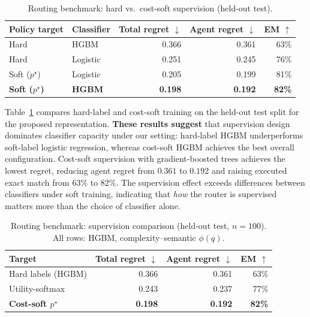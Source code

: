 \begin{table}[t]
  \centering
  \footnotesize
  \setlength{\tabcolsep}{3pt}
  \caption{Routing benchmark: hard vs.\ cost-soft supervision (held-out test).}
  \label{tab:hard-vs-soft}
  \begin{tabular}{@{}llrrr@{}}
    \toprule
    Policy target & Classifier & Total regret $\downarrow$ & Agent regret $\downarrow$ & EM $\uparrow$ \\
    \midrule
    Hard & HGBM & 0.366 & 0.361 & 63\% \\
    Hard & Logistic & 0.251 & 0.245 & 76\% \\
    Soft ($p^\star$) & Logistic & 0.205 & 0.199 & 81\% \\
    \textbf{Soft ($p^\star$)} & \textbf{HGBM} & \textbf{0.198} & \textbf{0.192} & \textbf{82\%} \\
    \bottomrule
  \end{tabular}
\end{table}

Table~\ref{tab:hard-vs-soft} compares hard-label and cost-soft training on the held-out test
split for the proposed representation.
\textbf{These results suggest} that supervision design dominates classifier capacity under our
setting: hard-label HGBM underperforms soft-label logistic regression, whereas cost-soft HGBM
achieves the best overall configuration.
Cost-soft supervision with gradient-boosted trees achieves the lowest regret, reducing agent
regret from $0.361$ to $0.192$ and raising executed exact match from 63\% to 82\%.
The supervision effect exceeds differences between classifiers under soft training,
indicating that \emph{how} the router is supervised matters more than the choice of
classifier alone.

\begin{table}[t]
  \centering
  \footnotesize
  \setlength{\tabcolsep}{3pt}
  \caption{Routing benchmark: supervision comparison (held-out test, $n{=}100$).
    All rows: HGBM, complexity--semantic $\phi(q)$.}
  \label{tab:soft-target}
  \begin{tabular}{@{}lrrr@{}}
    \toprule
    Target & Total regret $\downarrow$ & Agent regret $\downarrow$ & EM $\uparrow$ \\
    \midrule
    Hard labels (HGBM) & 0.366 & 0.361 & 63\% \\
    Utility-softmax & 0.243 & 0.237 & 77\% \\
    \textbf{Cost-soft $p^\star$} & \textbf{0.198} & \textbf{0.192} & \textbf{82\%} \\
    \bottomrule
  \end{tabular}
\end{table}

